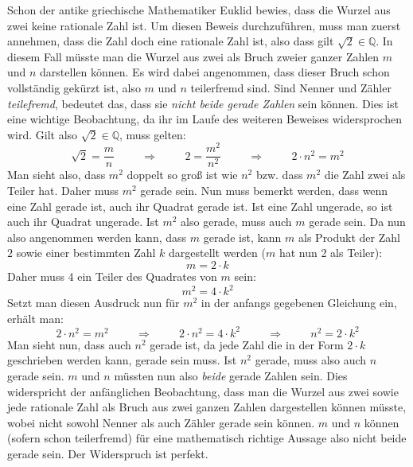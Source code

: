 Schon der antike griechische Mathematiker Euklid bewies, dass die Wurzel aus zwei keine rationale Zahl ist. Um diesen Beweis durchzuf\"{u}hren, muss man zuerst annehmen, dass die Zahl doch eine rationale Zahl ist, also dass gilt $\sqrt{2} \in \mathbb{Q}$. In diesem Fall m\"{u}sste man die Wurzel aus zwei als Bruch zweier ganzer Zahlen $m$ und $n$ darstellen k\"{o}nnen. Es wird dabei angenommen, dass dieser Bruch schon vollst\"{a}ndig gek\"{u}rzt ist, also $m$ und $n$ teilerfremd sind. Sind Nenner und Z\"{a}hler \emph{teilefremd}, bedeutet das, dass sie \emph{nicht beide gerade Zahlen} sein k\"{o}nnen. Dies ist eine wichtige Beobachtung, da ihr im Laufe des weiteren Beweises widersprochen wird. Gilt also $\sqrt{2} \in \mathbb{Q}$, muss gelten: $$\sqrt{2} = \frac{m}{n} \hspace{1cm} \Rightarrow \hspace{1cm} 2 = \frac{m^2}{n^2} \hspace{1cm} \Rightarrow \hspace{1cm} 2 \cdot n^2 = m^2$$ Man sieht also, dass $m^2$ doppelt so gro\ss{} ist wie $n^2$ bzw. dass $m^2$ die Zahl zwei als Teiler hat. Daher muss $m^2$ gerade sein. Nun muss bemerkt werden, dass wenn eine Zahl gerade ist, auch ihr Quadrat gerade ist. Ist eine Zahl ungerade, so ist auch ihr Quadrat ungerade. Ist $m^2$ also gerade, muss auch $m$ gerade sein. Da nun also angenommen werden kann, dass $m$ gerade ist, kann $m$ als Produkt der Zahl $2$ sowie einer bestimmten Zahl $k$ dargestellt werden ($m$ hat nun 2 als Teiler): $$m = 2 \cdot k$$ Daher muss 4 ein Teiler des Quadrates von $m$ sein: $$m^2 = 4 \cdot k^2$$ Setzt man diesen Ausdruck nun f\"{u}r $m^2$ in der anfangs gegebenen Gleichung ein, erh\"{a}lt man: $$2 \cdot n^2 = m^2 \hspace{1cm} \Rightarrow \hspace{1cm} 2 \cdot n^2 = 4 \cdot k^2 \hspace{1cm} \Rightarrow \hspace{1cm} n^2 = 2 \cdot k^2$$ Man sieht nun, dass auch $n^2$ gerade ist, da jede Zahl die in der Form $2 \cdot k$ geschrieben werden kann, gerade sein muss. Ist $n^2$ gerade, muss also auch $n$ gerade sein. $m$ und $n$ m\"{u}ssten nun also \emph{beide} gerade Zahlen sein. Dies widerspricht der anf\"{a}nglichen Beobachtung, dass man die Wurzel aus zwei sowie jede rationale Zahl als Bruch aus zwei ganzen Zahlen dargestellen k\"{o}nnen m\"{u}sste, wobei nicht sowohl Nenner als auch Z\"{a}hler gerade sein k\"{o}nnen. $m$ und $n$ k\"{o}nnen (sofern schon teilerfremd) f\"{u}r eine mathematisch richtige Aussage also nicht beide gerade sein. Der Widerspruch ist perfekt.

